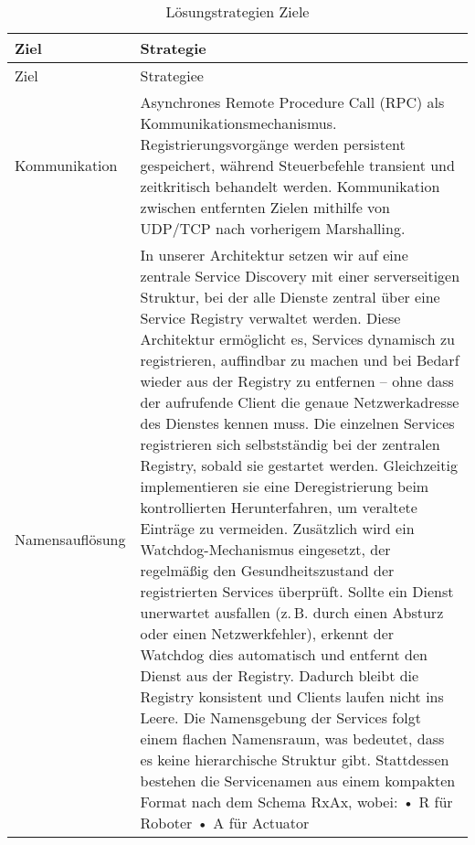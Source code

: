 \begin{longtable}{|>{\raggedright\arraybackslash}p{4cm}|>{\raggedright\arraybackslash}p{10cm}|}
	\caption{Lösungstrategien Ziele} \label{tab:loesungsstrategieZiele} \\
	\hline
	Ziel & Strategie \\
	\hline
	\endfirsthead
	
	\hline
	Ziel & Strategiee\\
	\hline
	\endhead
	
	\hline
	\endfoot
	
	Kommunikation &
	Asynchrones Remote Procedure Call (RPC) als Kommunikationsmechanismus. Registrierungsvorgänge werden persistent gespeichert, während Steuerbefehle transient und zeitkritisch behandelt werden. Kommunikation zwischen entfernten Zielen mithilfe von UDP/TCP nach vorherigem Marshalling.
	\\
	\hline
	Namensauflösung
	& In unserer Architektur setzen wir auf eine zentrale Service Discovery mit einer serverseitigen Struktur, bei der alle Dienste zentral über eine Service Registry verwaltet werden. Diese Architektur ermöglicht es, Services dynamisch zu registrieren, auffindbar zu machen und bei Bedarf wieder aus der Registry zu entfernen – ohne dass der aufrufende Client die genaue Netzwerkadresse des Dienstes kennen muss.
	Die einzelnen Services registrieren sich selbstständig bei der zentralen Registry, sobald sie gestartet werden. Gleichzeitig implementieren sie eine Deregistrierung beim kontrollierten Herunterfahren, um veraltete Einträge zu vermeiden. Zusätzlich wird ein Watchdog-Mechanismus eingesetzt, der regelmäßig den Gesundheitszustand der registrierten Services überprüft. Sollte ein Dienst unerwartet ausfallen (z. B. durch einen Absturz oder einen Netzwerkfehler), erkennt der Watchdog dies automatisch und entfernt den Dienst aus der Registry. Dadurch bleibt die Registry konsistent und Clients laufen nicht ins Leere.
	Die Namensgebung der Services folgt einem flachen Namensraum, was bedeutet, dass es keine hierarchische Struktur gibt. Stattdessen bestehen die Servicenamen aus einem kompakten Format nach dem Schema RxAx, wobei:
	•	R für Roboter
	•	A für Actuator
	

\end{longtable}

